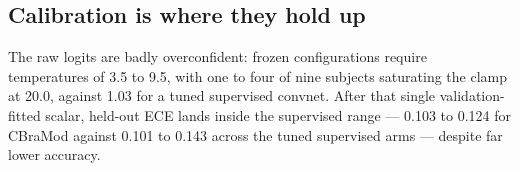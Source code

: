 \subsection{Calibration is where they hold up}
The raw logits are badly overconfident: frozen configurations require
temperatures of 3.5 to 9.5, with one to four of nine subjects saturating the
clamp at 20.0, against 1.03 for a tuned supervised convnet. After that single
validation-fitted scalar, held-out ECE lands inside the supervised range ---
0.103 to 0.124 for CBraMod against 0.101 to 0.143 across the tuned supervised
arms --- despite far lower accuracy.
